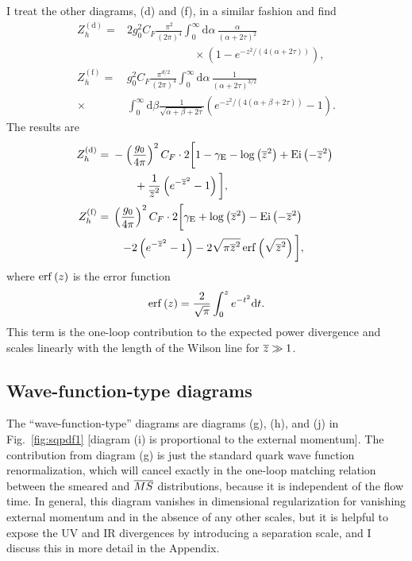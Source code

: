 I treat the other diagrams, (d) and (f), in a similar fashion and find
\begin{align}
Z_h^\mathrm{(d)} = {} & 2 g_0^2C_F\frac{\pi^2}{(2\pi)^4}\int_0^\infty\mathrm{d}\alpha\,\frac{\alpha}{(\alpha+2\tau)^2}\nonumber \\
{} & \qquad \qquad\qquad\times \left(1-e^{-z^2/(4(\alpha+2\tau))}\right),\\
Z_h^\mathrm{(f)} = {} & g_0^2C_F \frac{\pi^{d/2}}{(2\pi)^4}\int_0^\infty\mathrm{d}\alpha\,\frac{1}{(\alpha+2\tau)^{3/2}} \nonumber \\
\times {} & \int_0^\infty\mathrm{d}\beta\frac{1}{\sqrt{\alpha+\beta+2\tau}}\left(e^{-z^2/(4(\alpha+\beta+2\tau))}-1\right).
\end{align}
The results are
\begin{align}
\!\!Z_h^\mathrm{(d)} = {} & -\left(\frac{g_0}{4\pi}\right)^2C_F \cdot2\bigg[1-\gamma_{\mathrm{E}}-\log\left(\overline{z}^2\right)+\operatorname{Ei}\left(-\overline{z}^2\right) \nonumber \\
{} & \qquad  + \frac{1}{\overline{z}^2}\left(e^{-\overline{z}^2}-1\right)\bigg], \label{eq:htd}\\
\!\!
Z_h^\mathrm{(f)} = {} & \left(\frac{g_0}{4\pi}\right)^2C_F \cdot2\bigg[\gamma_{\mathrm{E}}+\log\left(\overline{z}^2\right)- \operatorname{Ei}\left(-\overline{z}^2\right)  \nonumber \\
{} & \quad {-} 2\left(e^{-\overline{z}^2}-1\right) -2\sqrt{\pi\overline{z}^2}\operatorname{erf}\left(\sqrt{\overline{z}^2}\right)\bigg],
\label{eq:htf}
\end{align}
where $\operatorname{erf}\left(z\right)$ is the error function
\begin{equation}
\operatorname{erf}\left(z\right) = \frac{2}{\sqrt{\pi}}\int_0^z e^{-t^2}\mathrm{d}t.
\end{equation}
This term is the one-loop contribution to the expected power divergence and scales linearly with the length of the Wilson line for $\overline{z} \gg 1$.

\subsection{Wave-function-type diagrams}

The ``wave-function-type'' diagrams are diagrams (g), (h), and (j) in Fig.~\ref{fig:sqpdf1} [diagram (i) is proportional to the external momentum]. The contribution from diagram (g) is just the standard quark wave function renormalization, which will cancel exactly in the one-loop matching relation between the smeared and $\overline{MS}$ distributions, because it is independent of the flow time.
In general, this diagram vanishes in dimensional regularization for vanishing external momentum and in the absence of any other scales, but it is helpful to expose the UV and IR divergences by introducing a separation scale, and I discuss this in more detail in the Appendix.

